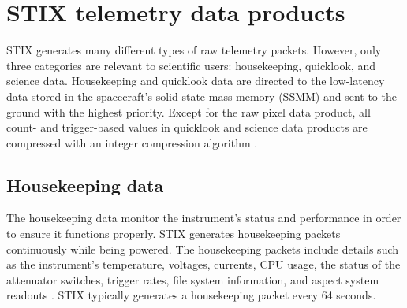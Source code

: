 \documentclass[referee]{aa} %
\begin{document}
\section{STIX telemetry data products}
\label{sec:raw-data}
STIX generates many different types of raw telemetry packets.
However, only three categories are relevant to scientific users: housekeeping, quicklook, and  science data. Housekeeping and quicklook data are directed to the low-latency data stored in the spacecraft's solid-state mass memory (SSMM) and sent to the ground with the highest priority.
Except for the raw pixel data product, all count- and trigger-based values in quicklook and  science data products are compressed with an integer compression algorithm \citep{stix2020}.

\subsection{Housekeeping  data}
 The housekeeping data monitor the instrument's status and performance in order to ensure it functions properly. 
 STIX generates housekeeping packets continuously while being powered.  
 The housekeeping packets include details such as the instrument's temperature, 
 voltages, currents, CPU usage, the status of the attenuator switches, 
 trigger rates, file system information, and aspect system readouts \citep{Warmuth2020, stix2020}. STIX typically generates a  housekeeping packet every 64 seconds. %

\end{document}
